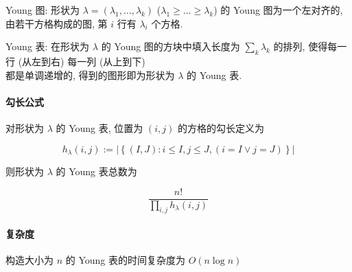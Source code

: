 Young 图: 形状为 \(\lambda=(\lambda_1,\dots,\lambda_k)\) (\(\lambda_1\geq \dots\geq \lambda_k\)) 的 Young 图为一个左对齐的, 由若干方格构成的图, 第 \(i\) 行有 \(\lambda_i\) 个方格.

Young 表: 在形状为 \(\lambda\) 的 Young 图的方块中填入长度为 \(\sum_k \lambda_k\) 的排列, 使得每一行 (从左到右) 每一列 (从上到下) \\ 都是单调递增的, 得到的图形即为形状为 \(\lambda\) 的 Young 表.

\paragraph{勾长公式}

对形状为 \(\lambda\) 的 Young 表, 位置为 \((i,j)\) 的方格的勾长定义为

\[
    h_{\lambda}(i,j):=\left|\left\{(I,J):i\leq I, j\leq J,(i=I \lor j=J)\right\}\right|
\]

则形状为 \(\lambda\) 的 Young 表总数为

\[
    \frac{n!}{\prod_{i,j} h_{\lambda}(i,j)}
\]

\paragraph{复杂度}

构造大小为 \(n\) 的 Young 表的时间复杂度为 \(O(n\log n)\)
